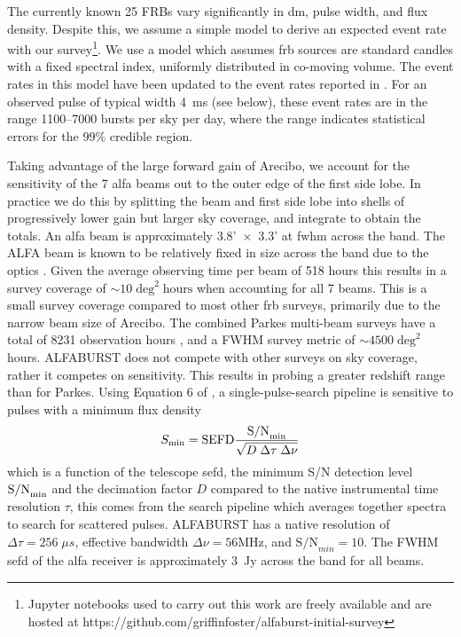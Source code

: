 \documentclass[a4paper,fleqn,usenatbib]{mnras}
\begin{document}
The currently known 25 FRBs vary significantly in \gls{dm}, pulse width, and
flux density. Despite this, we assume a simple model to derive an expected event
rate with our survey\footnote{Jupyter notebooks used to carry out this work are
freely available and are hosted at
https://github.com/griffinfoster/alfaburst-initial-survey}.  We use a model
\citep[see equation 9 of][]{2013MNRAS.436L...5L} which assumes \gls{frb} sources
are standard candles with a fixed spectral index, uniformly distributed in
co-moving volume. The event rates in this model have been updated to the
event rates reported in \cite{2016MNRAS.460.3370C}. For an observed pulse of
typical width 4~ms (see below), these event rates are in the range 1100--7000
bursts per sky per day, where the range indicates statistical errors for the
99\% credible region.

Taking advantage of the large forward gain of Arecibo, we account for the
sensitivity of the 7 \gls{alfa} beams out to the outer edge of the first side lobe.
In practice we do this by splitting the beam and first side lobe into shells of
progressively lower gain but larger sky coverage, and integrate to obtain the
totals.  An \gls{alfa} beam is approximately 3.8'~$\times$~3.3' at \gls{fwhm}
across the band.  The ALFA beam is known to be relatively fixed in size
across the band due to the optics \citep{GALFAbeam}.  Given the average
observing time per beam of 518 hours this results in a survey coverage of $\sim
10 \; \textrm{deg}^2 \; \textrm{hours}$ when accounting for all 7 beams. This is
a small survey coverage compared to most other \gls{frb} surveys, primarily due
to the narrow beam size of Arecibo. The combined Parkes multi-beam surveys have
a total of 8231 observation hours \citep{2016MNRAS.460.3370C}, and a FWHM survey
metric of $\sim 4500 \; \textrm{deg}^2$ hours.  ALFABURST does not compete with
other surveys on sky coverage, rather it competes on sensitivity. This results
in probing a greater redshift range than for Parkes. Using Equation 6 of
\cite{2015MNRAS.452.1254K}, a  single-pulse-search pipeline is sensitive to
pulses with a minimum flux density
%
\begin{equation}
S_{\rm min} = \textrm{SEFD} \frac{\textrm{S/N}_{\rm min}}{\sqrt{D \; \Delta \tau \;
\Delta \nu}}
\end{equation}
%
which is a function of the telescope \gls{sefd}, the minimum S/N detection level
$\textrm{S/N}_{\rm min}$ and the decimation factor $D$ compared to the native
instrumental time resolution $\tau$, this comes from the search pipeline which
averages together spectra to search for scattered pulses. ALFABURST has a native
resolution of $\Delta \tau = 256 \; \mu s$, effective bandwidth $\Delta \nu = 56
\textrm{MHz}$, and $\textrm{S/N}_{min} = 10$. The FWHM \gls{sefd} of the
\gls{alfa} receiver is approximately 3~Jy across the band for all beams.
\end{document}
